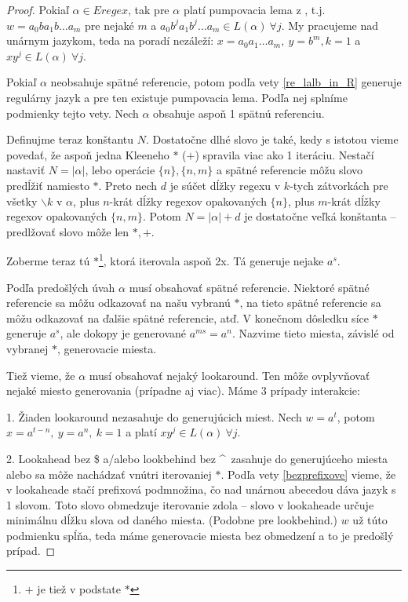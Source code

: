 \documentclass{svk_long_sk}
\begin{document}
\begin{proof}
Pokiaľ $\alpha \in Eregex$, tak pre $\alpha$ platí pumpovacia lema z \cite[Lemma 1]{ExtendedRegexPower}, t.j. $w = a_0ba_1b\dots a_m$ pre nejaké $m$ a $a_0b^ja_1b^j\dots a_m \in L(\alpha)~\forall j$. My pracujeme nad unárnym jazykom, teda na poradí nezáleží: $x=a_0a_1\dots a_m,~y=b^m, k=1$ a $xy^j \in L(\alpha)~\forall j$.

Pokiaľ $\alpha$ neobsahuje spätné referencie, potom podľa vety \ref{re_lalb_in_R} generuje regulárny jazyk a pre ten existuje pumpovacia lema. Podľa nej splníme podmienky tejto vety. Nech $\alpha$ obsahuje aspoň 1 spätnú referenciu.

Definujme teraz konštantu $N$. Dostatočne dlhé slovo je také, kedy s istotou vieme povedať, že aspoň jedna Kleeneho $*$ ($+$) spravila viac ako 1 iteráciu. Nestačí nastaviť $N=|\alpha|$, lebo operácie $\lbrace n \rbrace,\lbrace n,m\rbrace$ a spätné referencie môžu slovo predĺžiť namiesto $*$. Preto nech $d$ je súčet dĺžky regexu v $k$-tych zátvorkách pre všetky $\backslash k$ v $\alpha$, plus  $n$-krát dĺžky regexov opakovaných $\lbrace n\rbrace$, plus $m$-krát dĺžky regexov opakovaných $\lbrace n,m \rbrace$. Potom $N=|\alpha|+d$ je dostatočne veľká konštanta -- predlžovať slovo môže len $*,+$.

Zoberme teraz tú $*$\footnote{$+$ je tiež v podstate $*$}, ktorá iterovala aspoň 2x. Tá generuje nejake $a^s$.

Podľa predošlých úvah $\alpha$ musí obsahovať spätné referencie. Niektoré spätné referencie sa môžu odkazovať na našu vybranú $*$, na tieto spätné referencie sa môžu odkazovať na ďalšie spätné referencie, atď. V konečnom dôsledku síce $*$ generuje $a^s$, ale dokopy je generované $a^{ms} = a^n$. Nazvime tieto miesta, závislé od vybranej $*$, generovacie miesta.

Tiež vieme, že $\alpha$ musí obsahovať nejaký lookaround. Ten môže ovplyvňovať nejaké miesto generovania (prípadne aj viac). Máme 3 prípady interakcie:

1. Žiaden lookaround nezasahuje do generujúcich miest. Nech $w=a^t$, potom $x=a^{t-n},~y=a^n,~k=1$ a platí $xy^j\in L(\alpha) ~\forall j$.

2. Lookahead bez \$ a/alebo lookbehind bez \textasciicircum ~zasahuje do generujúceho miesta alebo sa môže nachádzať vnútri iterovaniej $*$. Podľa vety \ref{bezprefixove} vieme, že v lookaheade stačí prefixová podmnožina, čo nad unárnou abecedou dáva jazyk s 1 slovom. Toto slovo obmedzuje iterovanie zdola -- slovo v lookaheade určuje minimálnu dĺžku slova od daného miesta. (Podobne pre lookbehind.) $w$ už túto podmienku spĺňa, teda máme generovacie miesta bez obmedzení a to je predošlý prípad.


\end{proof}
\end{document}

